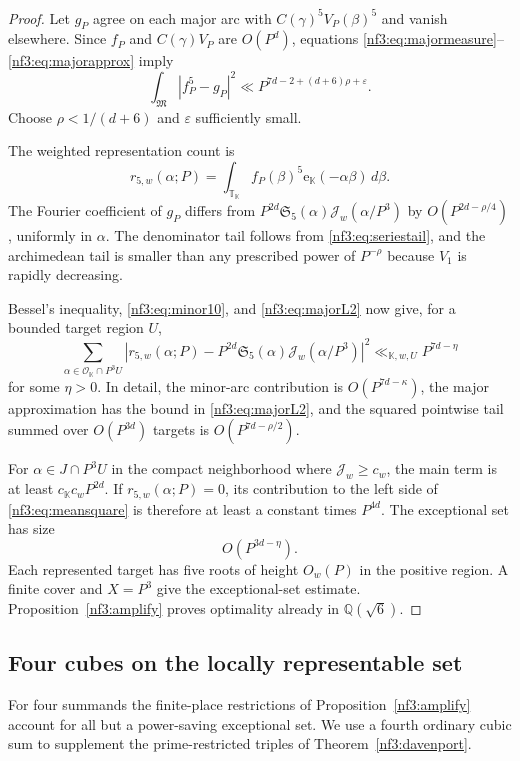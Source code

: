\documentclass[11pt,letterpaper]{article}
\theoremstyle{definition}
\numberwithin{equation}{section}
\begin{document}
\begin{proof}
Let $g_P$ agree on each major arc with $C(\gamma)^5V_P(\beta)^5$ and vanish elsewhere. Since $f_P$ and $C(\gamma)V_P$ are $O(P^d)$, equations \eqref{nf3:eq:majormeasure}--\eqref{nf3:eq:majorapprox} imply
\begin{equation}\label{nf3:eq:majorL2}
 \int_{\mathfrak M}|f_P^5-g_P|^2
 \ll P^{7d-2+(d+6)\rho+\varepsilon}.
\end{equation}
Choose $\rho<1/(d+6)$ and $\varepsilon$ sufficiently small.

The weighted representation count is
\[
 r_{5,w}(\alpha;P)=\int_{\mathbb T_{\mathbb K}}f_P(\beta)^5\mathrm e_{\mathbb K}(-\alpha\beta)\,d\beta.
\]
The Fourier coefficient of $g_P$ differs from
$P^{2d}\mathfrak S_5(\alpha)\mathcal J_w(\alpha/P^3)$
by $O(P^{2d-\rho/4})$, uniformly in $\alpha$. The denominator tail follows from \eqref{nf3:eq:seriestail}, and the archimedean tail is smaller than any prescribed power of $P^{-\rho}$ because $V_1$ is rapidly decreasing.

Bessel's inequality, \eqref{nf3:eq:minor10}, and \eqref{nf3:eq:majorL2} now give, for a bounded target region $U$,
\begin{equation}\label{nf3:eq:meansquare}
 \sum_{\alpha\in\mathcal O_{\mathbb K}\cap P^3U}
 \left|r_{5,w}(\alpha;P)-P^{2d}\mathfrak S_5(\alpha)
                     \mathcal J_w(\alpha/P^3)\right|^2
 \ll_{\mathbb K,w,U}P^{7d-\eta}
\end{equation}
for some $\eta>0$. In detail, the minor-arc contribution is $O(P^{7d-\kappa})$, the major approximation has the bound in \eqref{nf3:eq:majorL2}, and the squared pointwise tail summed over $O(P^{3d})$ targets is $O(P^{7d-\rho/2})$.

For $\alpha\in J\cap P^3U$ in the compact neighborhood where $\mathcal J_w\ge c_w$, the main term is at least $c_{\mathbb K}c_wP^{2d}$. If $r_{5,w}(\alpha;P)=0$, its contribution to the left side of \eqref{nf3:eq:meansquare} is therefore at least a constant times $P^{4d}$. The exceptional set has size
\[
 O(P^{3d-\eta}).
\]
Each represented target has five roots of height $O_w(P)$ in the positive region. A finite cover and $X=P^3$ give the exceptional-set estimate. Proposition~\ref{nf3:amplify} proves optimality already in $\mathbb Q(\sqrt6)$.
\end{proof}



\subsection{Four cubes on the locally representable set}\label{nf3:foursection}
For four summands the finite-place restrictions of
Proposition~\ref{nf3:amplify} account for all but a power-saving exceptional
set. We use a fourth ordinary cubic sum to supplement the prime-restricted
triples of Theorem~\ref{nf3:davenport}.
\end{document}

